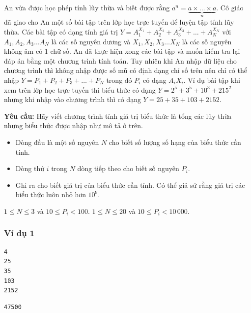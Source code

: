 
An vừa được học phép tính lũy thừa và biết được rằng $a^n = \underbrace{a \times \dots \times a}_{n}$. Cô giáo đã giao cho An một số bài tập trên lớp học trực tuyến để luyện tập tính lũy thừa. Các bài tập có dạng tính giá trị $Y = A_1^{X_1} + A_2^{X_2} + A_3^{X_3} + \dots + A_N^{X_N}$ với $A_1, A_2, A_3 \dots A_N$ là các số nguyên dương và $X_1, X_2, X_3 \dots X_N$ là các số nguyên không âm có 1 chữ số. An đã thực hiện xong các bài tập và muốn kiểm tra lại đáp án bằng một chương trình tính toán. Tuy nhiên khi An nhập dữ liệu cho chương trình thì không nhập được số mũ có định dạng chỉ số trên nên chỉ có thể nhập $Y = P_1 + P_2 + P_3 + \dots + P_N$ trong đó $P_i$ có dạng $A_iX_i$. Ví dụ bài tập khi xem trên lớp học trực tuyến thì biểu thức có dạng $Y = 2^5 + 3^5 + 10^3 + 215^2$ nhưng khi nhập vào chương trình thì có dạng $Y = 25 + 35 + 103 + 2152$.

\medskip
\textbf{Yêu cầu:} Hãy viết chương trình tính giá trị biểu thức là tổng các lũy thừa nhưng biểu thức được nhập như mô tả ở trên.

\begin{itemize}
    \item Dòng đầu là một số nguyên $N$ cho biết số lượng số hạng của biểu thức cần tính.
    \item Dòng thứ $i$ trong $N$ dòng tiếp theo cho biết số nguyên $P_i$.
\end{itemize}

\begin{itemize}
    \item Ghi ra cho biết giá trị của biểu thức cần tính. Có thể giả sử rằng giá trị các biểu thức luôn nhỏ hơn $10^9$.
\end{itemize}

\begin{makesubtasks}
     $1 \le N \le 3$ và $10 \le P_i < 100$.
     $1 \le N \le 20$ và $10 \le P_i < 10\,000$.
\end{makesubtasks}


\subsubsection*{Ví dụ 1}
\begin{makesample}
\begin{lstlisting}
4
25
35
103
2152
\end{lstlisting}
\nextsample
\begin{lstlisting}
47500
\end{lstlisting}
\end{makesample}